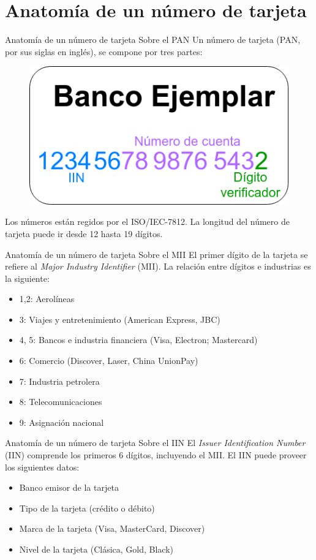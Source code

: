 %
%

\section{Anatomía de un número de tarjeta}

\begin{frame}{Anatomía de un número de tarjeta}
  {Sobre el PAN}
  Un número de tarjeta (PAN, por sus siglas en inglés), se compone por tres
  partes:
  \begin{figure}[H]
    \begin{center}
      \includegraphics[width=0.5\linewidth]{diagramas/tarjeta.png}
    \end{center}
  \end{figure}
    
  Los números están regidos por el ISO/IEC-7812.
  La longitud del número de tarjeta puede ir desde 12 hasta 19 dígitos.
\end{frame}

\begin{frame}{Anatomía de un número de tarjeta}
  {Sobre el MII}
  El primer dígito de la tarjeta se refiere al 
  \textit{Major Industry Identifier} (MII). La relación entre dígitos e
  industrias es la siguiente:
  \begin{itemize}
    \item 1,2: Aerolíneas
    \item 3: Viajes y entretenimiento (American Express, JBC) 
    \item 4, 5: Bancos e industria financiera (Visa, Electron; Mastercard) 
    \item 6: Comercio (Discover, Laser, China UnionPay)
    \item 7: Industria petrolera
    \item 8: Telecomunicaciones
    \item 9: Asignación nacional
  \end{itemize}
\end{frame}

\begin{frame}{Anatomía de un número de tarjeta}
  {Sobre el IIN}
  El \textit{Issuer Identification Number} (IIN) comprende los primeros
  6 dígitos, incluyendo el MII. El IIN puede proveer los siguientes datos:
  \begin{itemize}
    \item Banco emisor de la tarjeta
    \item Tipo de la tarjeta (crédito o débito)
    \item Marca de la tarjeta (Visa, MasterCard, Discover)
    \item Nivel de la tarjeta (Clásica, Gold, Black)
  \end{itemize}
\end{frame}


